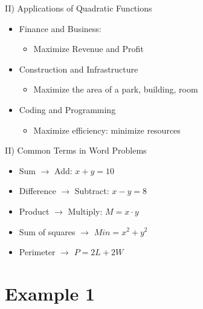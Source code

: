 \documentclass[aspectratio=169]{beamer}
\begin{document}
\begin{frame}{II) Applications of Quadratic Functions}
    \begin{tcolorbox}[colback=lightgray,colframe=primary,title=Applications]
        \footnotesize
        \begin{itemize}
            \item Finance and Business:
            \begin{itemize}
                \item Maximize Revenue and Profit
            \end{itemize}
            \item Construction and Infrastructure
            \begin{itemize}
                \item Maximize the area of a park, building, room
            \end{itemize}
            \item Coding and Programming
            \begin{itemize}
                \item Maximize efficiency: minimize resources
            \end{itemize}
        \end{itemize}
    \end{tcolorbox}
\end{frame}

\begin{frame}{II) Common Terms in Word Problems}
    \begin{tcolorbox}[colback=lightgray,colframe=primary,title=Common Terms]
        \footnotesize
        \begin{itemize}
            \item Sum $\rightarrow$ Add: $x + y = 10$
            \item Difference $\rightarrow$ Subtract: $x - y = 8$
            \item Product $\rightarrow$ Multiply: $M = x \cdot y$
            \item Sum of squares $\rightarrow$ $Min = x^2 + y^2$
            \item Perimeter $\rightarrow$ $P = 2L + 2W$
        \end{itemize}
    \end{tcolorbox}
\end{frame}

\section{Example 1}
\end{document}
